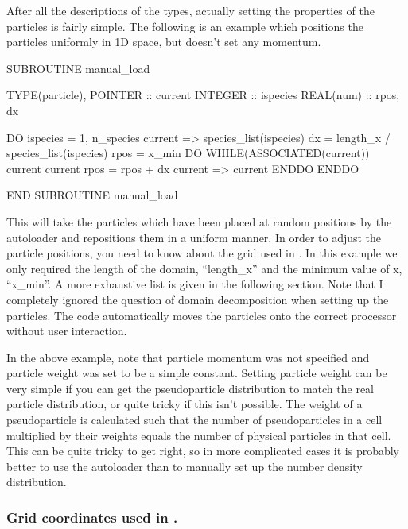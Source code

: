 After all the descriptions of the types, actually setting the properties of
the particles is fairly simple. The following is an example which positions
the particles uniformly in 1D space, but doesn't set any momentum.
\begin{boxverbatim}
  SUBROUTINE manual_load

    TYPE(particle), POINTER :: current
    INTEGER :: ispecies
    REAL(num) :: rpos, dx

    DO ispecies = 1, n_species
      current => species_list(ispecies)%
      dx = length_x / species_list(ispecies)%
      rpos = x_min
      DO WHILE(ASSOCIATED(current))
        current%
        current%
        rpos = rpos + dx
        current => current%
      ENDDO
    ENDDO

  END SUBROUTINE manual_load
\end{boxverbatim}

This will take the particles which have been placed at random positions
by the autoloader and repositions them in a uniform manner. In order to
adjust the particle positions, you need to know about the grid used in
{\EPOCH}. In this example we only required the length of the domain,
``length\_x'' and the minimum value of x, ``x\_min''. A more exhaustive
list is given in the following section. Note that
I completely ignored the question of domain decomposition when setting up the
particles. The code automatically moves the particles onto the correct
processor without user interaction.

In the above example, note that particle momentum was not specified and
particle weight was set to be a simple constant. Setting particle weight can
be very simple if you can get the pseudoparticle distribution to match the
real particle distribution, or quite tricky if this isn't possible. The
weight of a pseudoparticle is calculated such that the number of
pseudoparticles in a cell multiplied by their weights equals the number
of physical particles in that cell.
This can be quite tricky to get right, so in more complicated
cases it is probably better to use the autoloader than to manually set up the
number density distribution.

\subsubsection{Grid coordinates used in {\EPOCH}.}

